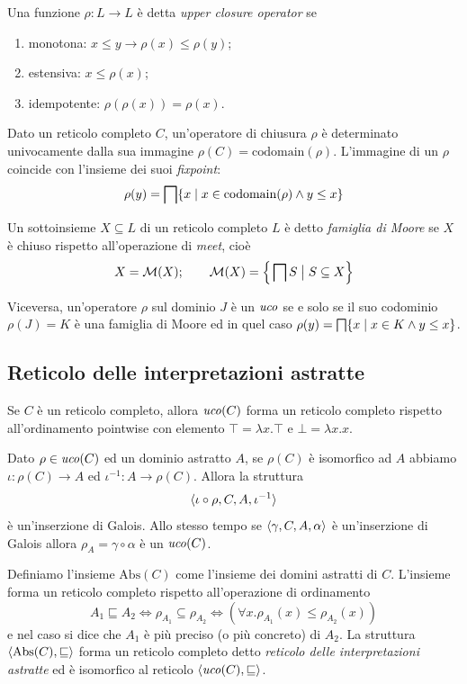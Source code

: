 \begin{definition}
Una funzione $\rho: L \to L$ è detta \emph{upper closure operator} se
\begin{enumerate}
    \item monotona: $x \le y \to \rho(x) \le \rho(y)$;
    \item estensiva: $x \le \rho(x)$;
    \item idempotente: $\rho(\rho(x)) = \rho(x)$.
\end{enumerate}
\end{definition}

Dato un reticolo completo $C$, un'operatore di chiusura $\rho$ è determinato univocamente dalla sua immagine $\rho(C) = \mathrm{codomain}(\rho)$. L'immagine di un $\rho$ coincide con l'insieme dei suoi \emph{fixpoint}:
\[ \rho(y) = \meet[\{x \mid x \in \mathrm{codomain}(\rho) \land y \le x \}] \]

\begin{definition}
Un sottoinsieme $X \subseteq L$ di un reticolo completo $L$ è detto \emph{famiglia di Moore} se $X$ è chiuso rispetto all'operazione di \emph{meet}, cioè
$$X = \mathcal{M}(X); \qquad \mathcal{M}(X) = \Big\{ \meet[S] \; \big| \; S \subseteq X \Big\}$$
\end{definition}

Viceversa, un'operatore $\rho$ sul dominio $J$ è un $\mathit{uco}$ se e solo se il suo codominio $\rho(J) = K$ è una famiglia di Moore ed in quel caso $\rho(y) = \meet[\{x \mid x \in K \land y \le x \}]$. 

\subsection{Reticolo delle interpretazioni astratte}

Se $C$ è un reticolo completo, allora $\mathit{uco}(C)$ forma un reticolo completo rispetto all'ordinamento pointwise con elemento $\top = \lambda x . \top$ e $\bot = \lambda x . x$. 

Dato $\rho \in \mathit{uco}(C)$ ed un dominio astratto $A$, se $\rho(C)$ è isomorfico ad $A$ abbiamo $\iota: \rho(C) \to A$ ed $\iota^{-1} : A \to \rho(C)$. Allora la struttura
\[ \langle \iota \circ \rho, C, A, \iota^{-1} \rangle \]
è un'inserzione di Galois. Allo stesso tempo se $\langle \gamma, C, A, \alpha \rangle$ è un'inserzione di Galois allora $\rho_{A} = \gamma \circ \alpha$ è un $\mathit{uco}(C)$.  

Definiamo l'insieme $\mathrm{Abs}(C)$ come l'insieme dei domini astratti di $C$. L'insieme forma un reticolo completo rispetto all'operazione di ordinamento
\[ A_1 \sqsubseteq A_2 
\iff \rho_{A_1} \subseteq \rho_{A_2} 
\iff \left( 
    \forall x . \rho_{A_1}(x) \le \rho_{A_2}(x)
\right) \]
e nel caso si dice che $A_1$ è più preciso (o più concreto) di $A_2$. La struttura $\langle \mathrm{Abs}(C), \sqsubseteq \rangle$ forma un reticolo completo detto \emph{reticolo delle interpretazioni astratte} ed è isomorfico al reticolo $\langle \mathit{uco}(C), \sqsubseteq \rangle$. 

